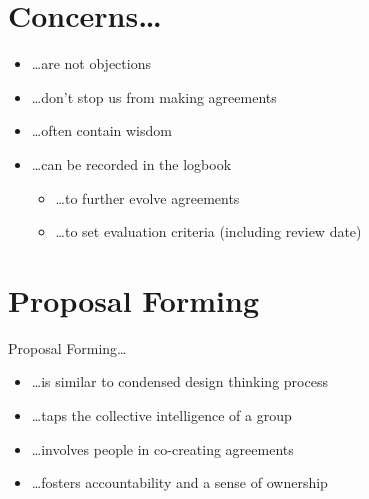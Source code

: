 \section{Concerns{\ldots}}
\label{concerns...}

\begin{itemize}
\item {\ldots}are not objections

\item {\ldots}don't stop us from making agreements

\item {\ldots}often contain wisdom

\item {\ldots}can be recorded in the logbook

\begin{itemize}
\item {\ldots}to further evolve agreements

\item {\ldots}to set evaluation criteria (including review date)

\end{itemize}

\end{itemize}

\section{Proposal Forming}
\label{proposalforming}

Proposal Forming{\ldots}

\begin{itemize}
\item {\ldots}is similar to condensed design thinking process

\item {\ldots}taps the collective intelligence of a group

\item {\ldots}involves people in co-creating agreements

\item {\ldots}fosters accountability and a sense of ownership

\end{itemize}

